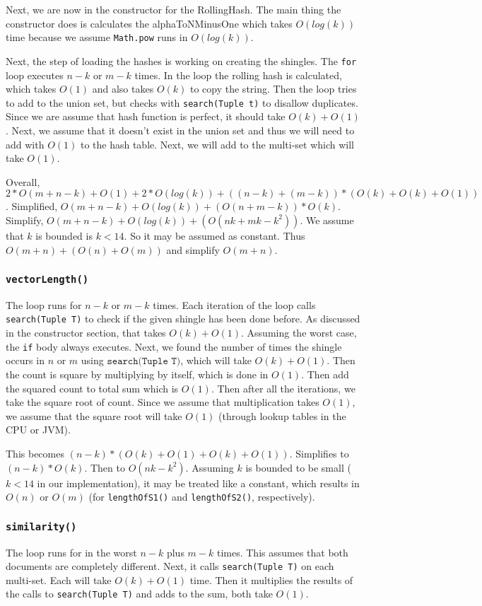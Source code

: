 \documentclass[10pt,letterpaper]{article}
\begin{document}
Next, we are now in the constructor for the RollingHash. The main thing the constructor does is
calculates the alphaToNMinusOne which takes $O(log(k))$ time because we assume \texttt{Math.pow} runs in $O(log(k))$.

Next, the step of loading the hashes is working on creating the shingles. The \texttt{for} loop executes $n-k$ or $m-k$ times. In the loop the rolling hash is calculated, which takes $O(1)$ and also takes $O(k)$ to copy the string. Then the loop tries to add to the union set, but checks with \texttt{search(Tuple t)} to disallow duplicates. Since we are assume that hash function is perfect, it should take $O(k) + O(1)$. Next, we assume that it doesn't exist in the union set and thus we will need to add with $O(1)$ to the hash table. Next, we will add to the multi-set which will take $O(1)$. 

Overall, $2*O(m+n-k)+O(1)+2*O(log(k))+((n-k)+(m-k))*(O(k)+O(k)+O(1))$. 
Simplified, $O(m+n-k)+O(log(k))+(O(n+m-k))*O(k)$. 
Simplify, $O(m+n-k)+O(log(k))+(O(nk+mk-k^2))$. We assume that $k$ is bounded is $k<14$. So it may be assumed as constant.
Thus $O(m+n)+(O(n)+O(m))$ and simplify $O(m+n)$.
\subsubsection{\texttt{vectorLength()}}
The loop runs for $n-k$ or $m-k$ times. Each iteration of the loop calls \texttt{search(Tuple T)} to check if the given shingle has been done before. As discussed in the constructor section, that takes $O(k) + O(1)$. Assuming the worst case, the \texttt{if} body always executes. Next, we found the number of times the shingle occurs in $n$ or $m$ using $ \texttt{search(Tuple T)}$, which will take $O(k) + O(1)$. Then the count is square by multiplying by itself, which is done in $O(1)$. Then add the squared count to total sum which is $O(1)$. Then after all the iterations, we take the square root of count. Since we assume that multiplication takes $O(1)$, we assume that the square root will take $O(1)$ (through lookup tables in the CPU or JVM).

This becomes $(n-k)*(O(k)+O(1)+O(k)+O(1))$. Simplifies to $(n-k)*O(k)$. Then to $O(nk-k^2)$. Assuming $k$ is bounded to be small ($k<14$ in our implementation), it may be treated like a constant, which results in $O(n)$ or $O(m)$ (for \texttt{lengthOfS1()} and \texttt{lengthOfS2()}, respectively).
\subsubsection{\texttt{similarity()}}
The loop runs for in the worst $n-k$ plus $m-k$ times. This assumes that both documents are completely different. Next, it calls \texttt{search(Tuple T)} on each multi-set. Each will take $O(k) + O(1)$ time. Then it multiplies the results of the calls to \texttt{search(Tuple T)} and adds to the sum, both take $O(1)$.
\end{document}
